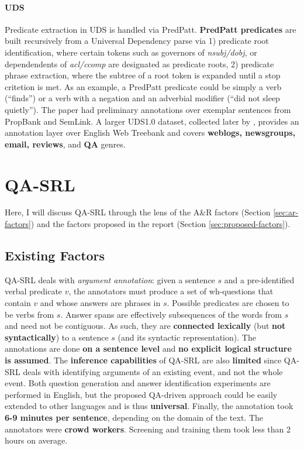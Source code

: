 \documentclass[11pt,a4paper]{article}
\begin{document}
\paragraph*{UDS} Predicate extraction in UDS \cite{white-etal-2016-universal} is handled via PredPatt. \textbf{PredPatt predicates} are built recursively from a Universal Dependency parse via 1) predicate root identification, where certain tokens such as governors of \textit{nsubj/dobj}, or dependendents of \textit{acl/ccomp} are designated as predicate roots, 2) predicate phrase extraction, where the subtree of a root token is expanded until a stop critetion is met. As an example, a PredPatt predicate could be simply a verb (``finds'') or a verb with a negation and an adverbial modifier (``did not sleep quietly''). The paper had preliminary annotations over exemplar sentences from PropBank and SemLink. A larger UDS1.0 dataset,  collected later by , provides an annotation layer over English Web Treebank \cite{bies2012english} and covers \textbf{weblogs, newsgroups, email, reviews}, and \textbf{QA} genres.


\section{QA-SRL}
Here, I will discuss QA-SRL \cite{he-etal-2015-question} through the lens of the A\&R factors (Section \ref{sec:ar-factors}) and the factors proposed in the report (Section \ref{sec:proposed-factors}).

\subsection{Existing Factors}
QA-SRL deals with \textit{argument annotation}: given a sentence $s$ and a pre-identified verbal predicate $v$, the annotators must produce a set of wh-questions that contain $v$ and whose answers are phrases in $s$. Possible predicates are chosen to be verbs from $s$. Answer spans are effectively subsequences of the words from $s$ and need not be contiguous. As such, they are \textbf{connected lexically} (but \textbf{not syntactically}) to a sentence $s$ (and its syntactic representation). The annotations are done \textbf{on a sentence level} and \textbf{no explicit logical structure is assumed}. The \textbf{inference capabilities} of QA-SRL are also \textbf{limited} since QA-SRL deals with identifying arguments of an existing event, and not the whole event. Both question generation and answer identification experiments are performed in English, but the proposed QA-driven approach could be easily extended to other languages and is thus \textbf{universal}. Finally, the annotation took \textbf{6-9 minutes per sentence}, depending on the domain of the text. The annotators were \textbf{crowd workers}. Screening and training them took less than 2 hours on average.
\end{document}
